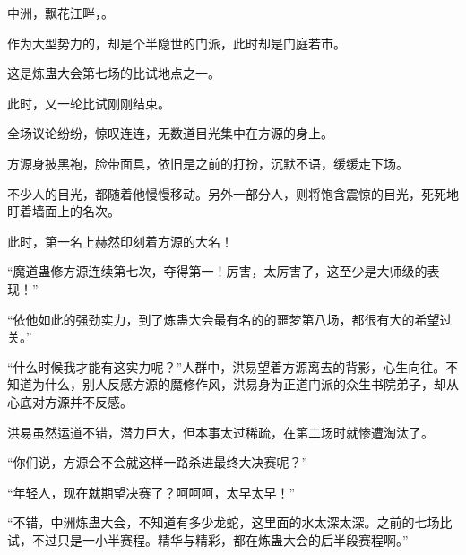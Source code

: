 \begin{this_body}
中洲，飘花江畔，。

作为大型势力的，却是个半隐世的门派，此时却是门庭若市。

这是炼蛊大会第七场的比试地点之一。

此时，又一轮比试刚刚结束。

全场议论纷纷，惊叹连连，无数道目光集中在方源的身上。

方源身披黑袍，脸带面具，依旧是之前的打扮，沉默不语，缓缓走下场。

不少人的目光，都随着他慢慢移动。另外一部分人，则将饱含震惊的目光，死死地盯着墙面上的名次。

此时，第一名上赫然印刻着方源的大名！

“魔道蛊修方源连续第七次，夺得第一！厉害，太厉害了，这至少是大师级的表现！”

“依他如此的强劲实力，到了炼蛊大会最有名的的噩梦第八场，都很有大的希望过关。”

“什么时候我才能有这实力呢？”人群中，洪易望着方源离去的背影，心生向往。不知道为什么，别人反感方源的魔修作风，洪易身为正道门派的众生书院弟子，却从心底对方源并不反感。

洪易虽然运道不错，潜力巨大，但本事太过稀疏，在第二场时就惨遭淘汰了。

“你们说，方源会不会就这样一路杀进最终大决赛呢？”

“年轻人，现在就期望决赛了？呵呵呵，太早太早！”

“不错，中洲炼蛊大会，不知道有多少龙蛇，这里面的水太深太深。之前的七场比试，不过只是一小半赛程。精华与精彩，都在炼蛊大会的后半段赛程啊。”

\end{this_body}

